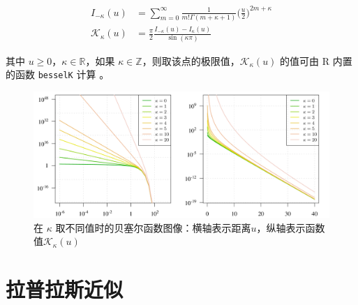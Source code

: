 \documentclass[12pt,a4paper,UTF8,twoside]{book}
\theoremstyle{definition}
\theoremstyle{definition}
\theoremstyle{definition}
\theoremstyle{remark}
\begin{document}
\begin{equation}
\begin{aligned}
I_{-\kappa}(u) & =  \sum_{m=0}^{\infty} \frac{1}{m!\Gamma(m + \kappa + 1)} \big(\frac{u}{2}\big)^{2m + \kappa} \\
\mathcal{K}_{\kappa}(u) & = \frac{\pi}{2} \frac{I_{-\kappa}(u) - I_{\kappa}(u)}{\sin (\kappa \pi)}
\end{aligned} \label{eq:besselK-function}
\end{equation}

\noindent 其中 \(u \geq 0\)，\(\kappa \in \mathbb{R}\)，如果
\(\kappa \in \mathbb{Z}\)，则取该点的极限值，\(\mathcal{K}_{\kappa}(u)\)
的值可由 R 内置的函数 \texttt{besselK} 计算 \citep{Campbell1980}。

\begin{figure}

{\centering \includegraphics[width=0.7\linewidth]{figures/bessel} 

}

\caption{在 \(\kappa\)
取不同值时的贝塞尔函数图像：横轴表示距离\(u\)，纵轴表示函数值\(\mathcal{K}_{\kappa}(u)\)}\label{fig:bessel-function}
\end{figure}




\hypertarget{sec:Laplace-approximation}{%
\section{拉普拉斯近似}\label{sec:Laplace-approximation}}
\end{document}
